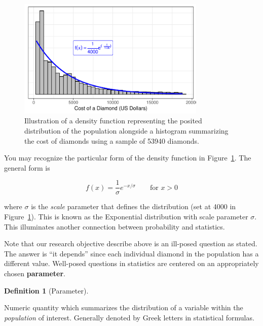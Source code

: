\documentclass[
  letterpaper,
  DIV=11,
  numbers=noendperiod]{scrreprt}
\theoremstyle{plain}
\theoremstyle{definition}
\newtheorem{definition}{Definition}[chapter]
\theoremstyle{definition}
\theoremstyle{remark}
\begin{document}
\begin{figure}

{\centering \includegraphics[width=0.8\textwidth,height=\textheight]{./images/fig-randomvariables-density-1.pdf}

}

\caption{\label{fig-randomvariables-density}Illustration of a density
function representing the posited distribution of the population
alongside a histogram summarizing the cost of diamonds using a sample of
53940 diamonds.}

\end{figure}

You may recognize the particular form of the density function in
Figure~\ref{fig-randomvariables-density}. The general form is

\[f(x) = \frac{1}{\sigma} e^{-x / \sigma} \qquad \text{for } x > 0\]

where \(\sigma\) is the \emph{scale} parameter that defines the
distribution (set at 4000 in Figure~\ref{fig-randomvariables-density}).
This is known as the Exponential distribution with scale parameter
\(\sigma\). This illuminates another connection between probability and
statistics.

Note that our research objective describe above is an ill-posed question
as stated. The answer is ``it depends'' since each individual diamond in
the population has a different value. Well-posed questions in statistics
are centered on an appropriately chosen \textbf{parameter}.

\begin{definition}[Parameter]\protect\hypertarget{def-parameter}{}\label{def-parameter}

Numeric quantity which summarizes the distribution of a variable within
the \emph{population} of interest. Generally denoted by Greek letters in
statistical formulas.

\end{definition}
\end{document}

